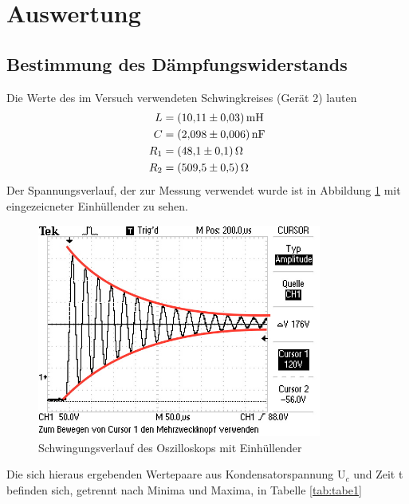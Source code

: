 \section{Auswertung}
\subsection{Bestimmung des Dämpfungswiderstands}
Die Werte des im Versuch verwendeten Schwingkreises (Gerät 2) lauten
\begin{align*}
  L &= \SI{10.11(3)}{\milli\henry} \\
  C &= \SI{2.098(6)}{\nano\farad} \\
  R_1 &= \SI{48.1 (1)}{\ohm} \\
  R_2 &= \SI{509.5(5)}{\ohm} \\
\end{align*}
\noindent Der Spannungsverlauf, der zur Messung verwendet wurde ist in Abbildung \ref{fig:fig1}
mit eingezeicneter Einhüllender zu sehen.
\begin{figure}[H]
  \centering
  \includegraphics[height=7cm]{Schwingung.JPG}
  \caption{Schwingungsverlauf des Oszilloskops mit Einhüllender}
  \label{fig:fig1}
\end{figure}

\noindent Die sich hieraus ergebenden Wertepaare aus Kondensatorspannung $\text{U}_c$
und Zeit t befinden sich, getrennt nach Minima und Maxima, in Tabelle \ref{tab:tabe1}



